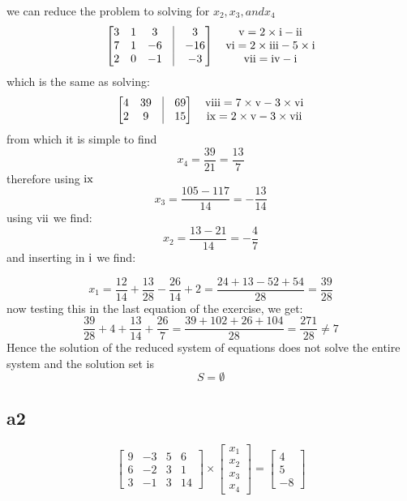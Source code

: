 \documentclass[a4paper,10pt]{article}
\newcommand{\RN}[1]{%
  \textup{\uppercase\expandafter{\romannumeral#1}}%
}
\begin{document}
we can reduce the problem to solving for $x_2,x_3,and x_4$
\[
\begin{bmatrix}
 3 & 1 & 3 & \vline & 3\\
 7 & 1 & -6& \vline & -16\\
 2 & 0 & -1 & \vline & -3
\end{bmatrix}
\quad
\begin{matrix}
 \RN{5} = 2\times \RN{1}-\RN{2} \\ \RN{6}=2 \times \RN{3}-5 \times \RN{1} \\\RN{7}= \RN{4}-\RN{1}
\end{matrix}
\]
which is the same as solving:\\
\[
\begin{bmatrix}
 4 & 39 & \vline & 69\\
 2 & 9 & \vline & 15
\end{bmatrix}
\quad
\begin{matrix}
 \RN{8}=7\times \RN{5}-3\times \RN{6} \\\RN{9}= 2\times \RN{5} - 3\times \RN{7}
\end{matrix}
\]
from which it is simple to find
\[
x_4 = \frac{39}{21}= \frac{13}{7}
\]
therefore using $\RN{9}$
\[
x_3= \frac{105-117}{14}= -\frac{13}{14}
\]
using $\RN{7}$ we find:
\[
x_2 = \frac{13-21}{14}= -\frac{4}{7}
\]
and inserting in $\RN{1}$ we find:

\[
x_1= \frac{12}{14} +\frac{13}{28} -\frac{26}{14}+2= \frac{24+13-52+54}{28}=\frac{39}{28}
\]
now testing this in the last equation of the exercise, we get:
\[
\frac{39}{28} + 4 +\frac{13}{14} +\frac{26}{7}=\frac{39+102+26+104}{28}= \frac{271}{28} \neq 7
\]
Hence the solution of the reduced system of equations does not solve the entire system and the solution set is 
\[
S = \emptyset
\]
\subsection*{a2}
\[
\begin{bmatrix}
  9 & -3 & 5 & 6 \\
  6 & -2 & 3 & 1\\
  3 & -1 & 3 & 14
\end{bmatrix}
\times
\begin{bmatrix}
 x_1\\x_2\\x_3\\x_4
\end{bmatrix}
=
\begin{bmatrix}
 4 \\ 5\\-8
\end{bmatrix}
\]
\end{document}
